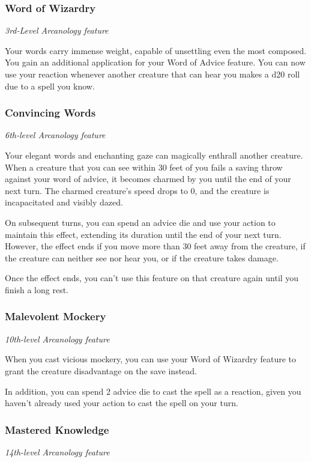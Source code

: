 \documentclass[letterpaper,openany,twoside,twocolumn]{book}
\begin{document}
	\eject
	
	\subsubsection*{Word of Wizardry}
	\textnormal{\textit{3rd-Level Arcanology feature}}
	
	Your words carry immense weight, capable of unsettling even the most composed. You gain an additional application for your Word of Advice feature. You can now use your reaction whenever another creature that can hear you makes a d20 roll due to a spell you know.
	
	\subsubsection*{Convincing Words}
	\textnormal{\textit{6th-level Arcanology feature}}
	
	Your elegant words and enchanting gaze can magically enthrall another creature. When a creature that you can see within 30 feet of you fails a saving throw against your word of advice, it becomes charmed by you until the end of your next turn. The charmed creature’s speed drops to 0, and the creature is incapacitated and visibly dazed.
	
	On subsequent turns, you can spend an advice die and use your action to maintain this effect, extending its duration until the end of your next turn. However, the effect ends if you move more than 30 feet away from the creature, if the creature can neither see nor hear you, or if the creature takes damage.
	
	Once the effect ends, you can’t use this feature on that creature again until you finish a long rest.
	
	\subsubsection*{Malevolent Mockery}
	\textnormal{\textit{10th-level Arcanology feature}}
	
	When you cast vicious mockery, you can use your Word of Wizardry feature to grant the creature disadvantage on the save instead.
	
	In addition, you can spend 2 advice die to cast the spell as a reaction, given you haven't already used your action to cast the spell on your turn.
	
	\subsubsection*{Mastered Knowledge}
	\textnormal{\textit{14th-level Arcanology feature}}
	
\end{document}
